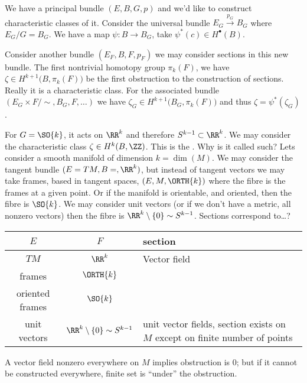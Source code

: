 We have a principal bundle $(E,B,G,p)$ and we'd like to construct
characteristic classes of it. Consider the universal bundle
$E_{G}\xrightarrow{p_{G}}B_{G}$ where $E_{G}/G=B_{G}$. We have a
map $\psi\colon B\to B_{G}$, take $\psi^{*}(c)\in H^{\bullet}(B)$.

Consider another bundle $(E_{F}, B,F,p_{F})$ we may consider
sections in this new bundle. The first nontrivial homotopy group
$\pi_{k}(F)$, we have $\zeta\in H^{k+1}\bigl(B,\pi_{k}(F)\bigr)$
be the first obstruction to the construction of sections. Really
it is a characteristic class. For the associated bundle
$(E_{G}\times F/\sim, B_{G}, F,\dots)$ we have 
$\zeta_{G}\in H^{k+1}\bigl(B_{G},\pi_{k}(F)\bigr)$
and thus $\zeta=\psi^{*}(\zeta_{G})$.

For $G=\SO{k}$, it acts on $\RR^k$ and therefore
$S^{k-1}\subset\RR^{k}$. We may consider the characteristic class
$\zeta\in H^{k}(B,\ZZ)$. This is the .
Why is it called such? Lets consider a smooth manifold of
dimension $k=\dim(M)$. We may consider the tangent bundle
$(E=TM,B=,\RR^k)$, but instead of tangent vectors we may take
frames, based in tangent spaces, $(E,M,\ORTH{k})$ where the fibre
is the frames at a given point. Or if the manifold is orientable,
and oriented, then the fibre is $\SO{k}$. We may consider unit
vectors (or if we don't have a metric, all nonzero vectors) then
the fibre is $\RR^{k}\setminus\{0\}\homotopic S^{k-1}$. Sections
correspond to\dots?
\begin{center}
\begin{tabular}{c|c|p{5cm}}
   $E$          &    $F$     & section \\ \hline
$TM$            & $\RR^k$    & Vector field\\
frames          & $\ORTH{k}$ & \\
oriented frames & $\SO{k}$   & \\
unit vectors    & $\RR^k\setminus\{0\}\homotopic S^{k-1}$ & unit
vector fields, section exists on $M$ except on finite number of points
\end{tabular}
\end{center}
\noindent{}A vector field nonzero everywhere on $M$ implies obstruction is
0; but if it cannot be constructed everywhere, finite set is
``under'' the obstruction.

